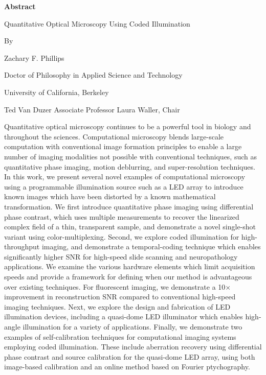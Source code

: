 \begin{center}
    \textbf{Abstract}

    \vspace{1.2cm}
     Quantitative Optical Microscopy Using Coded Illumination

    \vspace{0.4cm}

    By

    \vspace{0.4cm}
    Zachary F. Phillips

     \vspace{0.4cm}
     Doctor of Philosophy in Applied Science and Technology

     \vspace{0.4cm}
     University of California, Berkeley

     \vspace{0.4cm}
     Ted Van Duzer Associate Professor Laura Waller, Chair

    \vspace{0.8cm}


\end{center}

Quantitative optical microscopy continues to be a powerful tool in biology and throughout the sciences. Computational microscopy blends large-scale computation with conventional image formation principles to enable a large number of imaging modalities not possible with conventional techniques, such as quantitative phase imaging, motion deblurring, and super-resolution techniques. In this work, we present several novel examples of computational microscopy using a programmable illumination source such as a LED array to introduce known images which have been distorted by a known mathematical transformation. We first introduce quantitative phase imaging using differential phase contrast, which uses multiple measurements to recover the linearized complex field of a thin, transparent sample, and demonstrate a novel single-shot variant using color-multiplexing. Second, we explore coded illumination for high-throughput imaging, and demonstrate a temporal-coding technique which enables significantly higher SNR for high-speed slide scanning and neuropathology applications. We examine the various hardware elements which limit acquisition speeds and provide a framework for defining when our method is advantageous over existing techniques. For fluorescent imaging, we demonstrate a 10$\times$ improvement in reconstruction SNR compared to conventional high-speed imaging techniques. Next, we explore the design and fabrication of LED illumination devices, including a quasi-dome LED illuminator which enables high-angle illumination for a variety of applications. Finally, we demonstrate two examples of self-calibration techniques for computational imaging systems employing coded illumination. These include aberration recovery using differential phase contrast and source calibration for the quasi-dome LED array, using both image-based calibration and an online method based on Fourier ptychography.
